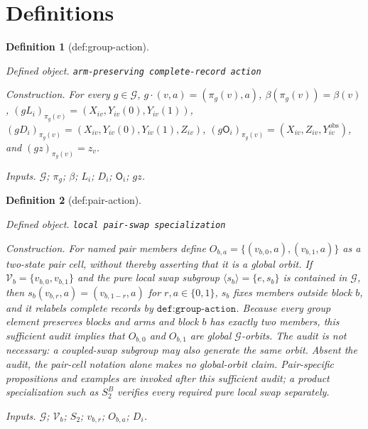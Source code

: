 \documentclass{article}
\newtheorem{definition}{Definition}
\begin{document}
\section{Definitions}

\begin{definition}[def:group-action]\label{def:group-action}
\par\smallskip\noindent\emph{Defined object.} \texttt{arm-\allowbreak{}preserving complete-\allowbreak{}record action}
\par\smallskip\noindent\emph{Construction.} For every \(g\in\mathcal G\), \(g\cdot(v,a)=(\pi_g(v),a)\), \(\beta(\pi_g(v))=\beta(v)\), \((gL_i)_{\pi_g(v)}=(X_{iv},Y_{iv}(0),Y_{iv}(1))\), \((gD_i)_{\pi_g(v)}=(X_{iv},Y_{iv}(0),Y_{iv}(1),Z_{iv})\), \((g\mathsf O_i)_{\pi_g(v)}=(X_{iv},Z_{iv},Y^{\mathrm{obs}}_{iv})\), and \((gz)_{\pi_g(v)}=z_v\).
\par\smallskip\noindent\emph{Inputs.} \(\mathcal G\); \(\pi_g\); \(\beta\); \(L_i\); \(D_i\); \(\mathsf O_i\); \(gz\).
\end{definition}

\begin{definition}[def:pair-action]\label{def:pair-action}
\par\smallskip\noindent\emph{Defined object.} \texttt{local pair-\allowbreak{}swap specialization}
\par\smallskip\noindent\emph{Construction.} For named pair members define \(O_{b,a}=\{(v_{b,0},a),(v_{b,1},a)\}\) as a two-state pair cell, without thereby asserting that it is a global orbit. If \(\mathcal V_b=\{v_{b,0},v_{b,1}\}\) and the pure local swap subgroup \(\langle s_b\rangle=\{e,s_b\}\) is contained in \(\mathcal G\), then \(s_b(v_{b,r},a)=(v_{b,1-r},a)\) for \(r,a\in\{0,1\}\), \(s_b\) fixes members outside block \(b\), and it relabels complete records by \(\texttt{def:group-action}\). Because every group element preserves blocks and arms and block \(b\) has exactly two members, this sufficient audit implies that \(O_{b,0}\) and \(O_{b,1}\) are global \(\mathcal G\)-orbits. The audit is not necessary: a coupled-swap subgroup may also generate the same orbit. Absent the audit, the pair-cell notation alone makes no global-orbit claim. Pair-specific propositions and examples are invoked after this sufficient audit; a product specialization such as \(S_2^B\) verifies every required pure local swap separately.
\par\smallskip\noindent\emph{Inputs.} \(\mathcal G\); \(\mathcal V_b\); \(S_2\); \(v_{b,r}\); \(O_{b,a}\); \(D_i\).
\end{definition}
\end{document}
